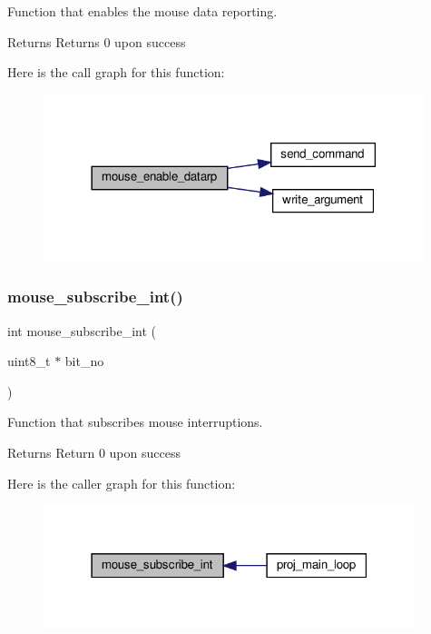 Function that enables the mouse data reporting. 

\begin{DoxyReturn}{Returns}
Returns 0 upon success 
\end{DoxyReturn}
Here is the call graph for this function\+:
\nopagebreak
\begin{figure}[H]
\begin{center}
\leavevmode
\includegraphics[width=314pt]{group__mouse_ga90562ec8e969e4014d728adb0fc91e31_cgraph}
\end{center}
\end{figure}
\mbox{\label{group__mouse_ga9da18257ff113b686bb826d154bfaa87}} 
\subsubsection{\texorpdfstring{mouse\+\_\+subscribe\+\_\+int()}{mouse\_subscribe\_int()}}
{\footnotesize\ttfamily int mouse\+\_\+subscribe\+\_\+int (\begin{DoxyParamCaption}\item[{uint8\+\_\+t $\ast$}]{bit\+\_\+no }\end{DoxyParamCaption})}



Function that subscribes mouse interruptions. 

\begin{DoxyReturn}{Returns}
Return 0 upon success 
\end{DoxyReturn}
Here is the caller graph for this function\+:\nopagebreak
\begin{figure}[H]
\begin{center}
\leavevmode
\includegraphics[width=307pt]{group__mouse_ga9da18257ff113b686bb826d154bfaa87_icgraph}
\end{center}
\end{figure}
\mbox{\label{group__mouse_ga685ad2706aca36d9869a30a19b9f446a}} 
